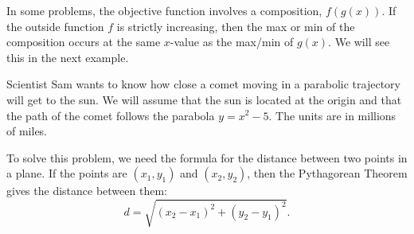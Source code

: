 \documentclass[handout]{ximera}
\begin{document}
In some problems, the objective function involves a composition, $f(g(x))$.  
If the outside function $f$ is strictly increasing, then the max or min of the composition 
occurs at the same $x$-value as the max/min of $g(x)$. 
We will see this in the next example.


\begin{example}[example 4]
Scientist Sam wants to know how close a comet moving in a parabolic trajectory will get to the sun. 
We will assume that the sun is located at the origin and that the path of the comet 
follows the parabola $y = x^2 - 5$. The units 
are in millions of miles.

\begin{center}
\end{center}
To solve this problem, we need the formula for the distance between two points in a plane.
If the points are $(x_1, y_1)$ and $(x_2, y_2)$, then the Pythagorean Theorem gives the distance between them:
\[
d = \sqrt{(x_2 - x_1)^2 + (y_2 - y_1)^2}.
\]
\begin{image}
\end{image}



\end{example}
\end{document}
